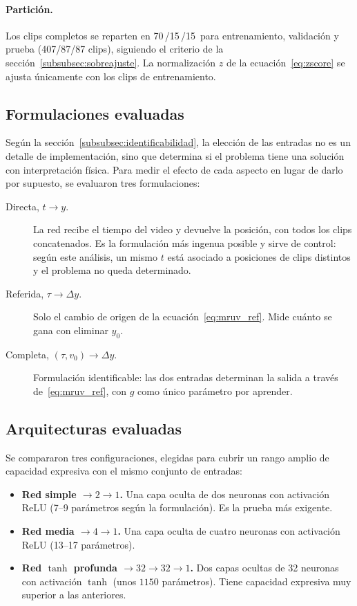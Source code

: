 \documentclass[titlepage,11pt]{article}
\providecommand{\num}[1]{\ensuremath{#1}}
\providecommand{\SI}[2]{#1\,#2}
\providecommand{\percent}{\char37\relax}
\begin{document}
\paragraph{Partición.} Los clips completos se reparten en
\SI{70}{\percent}/\SI{15}{\percent}/\SI{15}{\percent} para entrenamiento,
validación y prueba (407/87/87 clips), siguiendo el criterio de la
sección~\ref{subsubsec:sobreajuste}. La normalización $z$ de la
ecuación~\eqref{eq:zscore} se ajusta únicamente con los clips de
entrenamiento.

\subsection{Formulaciones evaluadas}
\label{subsec:formulaciones}

Según la sección~\ref{subsubsec:identificabilidad}, la elección de las entradas
no es un detalle de implementación, sino que determina si el problema tiene una solución
con interpretación física. Para medir el efecto de cada aspecto en lugar de
darlo por supuesto, se evaluaron tres formulaciones:

\begin{description}
\item[Directa, $t\to y$.] La red recibe el tiempo del video y devuelve la
  posición, con todos los clips concatenados. Es la formulación más ingenua
  posible y sirve de control: según este análisis, un mismo
  $t$ está asociado a posiciones de clips distintos y el problema no queda
  determinado.
\item[Referida, $\tau\to\Delta y$.] Solo el cambio de origen de la
  ecuación~\eqref{eq:mruv_ref}. Mide cuánto se gana con eliminar $y_0$.
\item[Completa, $(\tau,v_0)\to\Delta y$.] Formulación identificable: las dos
  entradas determinan la salida a través de~\eqref{eq:mruv_ref}, con $g$ como
  único parámetro por aprender.
\end{description}

\subsection{Arquitecturas evaluadas}
\label{subsec:arquitecturas}

Se compararon tres configuraciones, elegidas para cubrir un rango amplio de
capacidad expresiva con el mismo conjunto de entradas:

\begin{itemize}
\item \textbf{Red simple $\to2\to1$.} Una capa oculta de dos neuronas con
  activación ReLU (7--9 parámetros según la formulación). Es la prueba más
  exigente.
\item \textbf{Red media $\to4\to1$.} Una capa oculta de cuatro neuronas con
  activación ReLU (13--17 parámetros).
\item \textbf{Red $\tanh$ profunda $\to32\to32\to1$.} Dos capas ocultas de 32
  neuronas con activación $\tanh$ (unos \num{1150} parámetros). Tiene capacidad
  expresiva muy superior a las anteriores.
\end{itemize}
\end{document}
